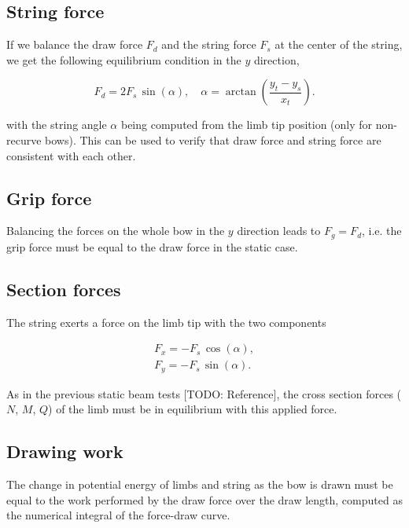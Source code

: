 \subsection*{String force}

If we balance the draw force $F_d$ and the string force $F_s$ at the center of the string, we get the following equilibrium condition in the $y$ direction,

\begin{equation}
F_d = 2F_s\,\sin(\alpha),\quad \alpha = \arctan\left(\frac{y_t - y_s}{x_t}\right).
\end{equation}

with the string angle $\alpha$ being computed from the limb tip position (only for non-recurve bows).
This can be used to verify that draw force and string force are consistent with each other.

\subsection*{Grip force}

Balancing the forces on the whole bow in the $y$ direction leads to $F_g = F_d$, i.e. the grip force must be equal to the draw force in the static case.

\subsection*{Section forces}

The string exerts a force on the limb tip with the two components

\begin{align}
F_x = -F_s\,\cos(\alpha), \\
F_y = -F_s\,\sin(\alpha).
\end{align}

As in the previous static beam tests [TODO: Reference], the cross section forces ($N$, $M$, $Q$) of the limb must be in equilibrium with this applied force.

\subsection*{Drawing work}

The change in potential energy of limbs and string as the bow is drawn must be equal to the work performed by the draw force over the draw length, computed as the numerical integral of the force-draw curve.



